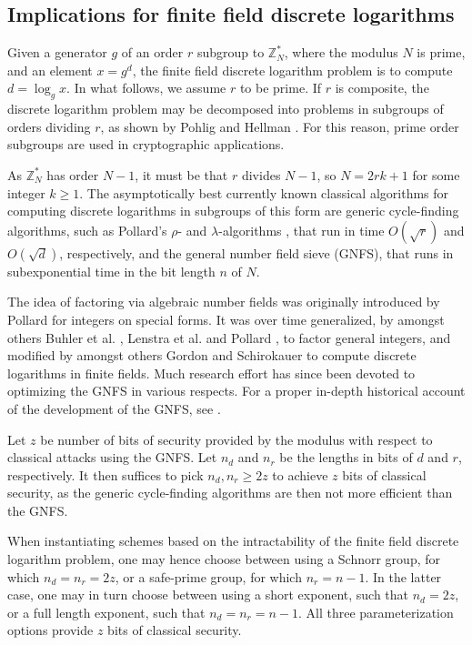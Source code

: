 \documentclass[superscriptaddress,notitlepage,longbibliography]{revtex4-1}
\theoremstyle{definition}
\theoremstyle{definition}
\newcommand{\gen}{g}
\begin{document}
\subsection{Implications for finite field discrete logarithms}
Given a generator $\gen$ of an order $r$ subgroup to $\mathbb Z^*_N$, where the modulus $N$ is prime, and an element $x = \gen^d$, the finite field discrete logarithm problem is to compute $d = \log_{\gen} x$. In what follows, we assume $r$ to be prime. If $r$ is composite, the discrete logarithm problem may be decomposed into problems in subgroups of orders dividing $r$, as shown by Pohlig and Hellman \cite{pohlig-hellman}. For this reason, prime order subgroups are used in cryptographic applications.

As $\mathbb Z_N^*$ has order $N-1$, it must be that $r$ divides $N-1$, so $N = 2rk+1$ for some integer $k \ge 1$. The asymptotically best currently known classical algorithms for computing discrete logarithms in subgroups of this form are generic cycle-finding algorithms, such as Pollard's $\rho$- and $\lambda$-algorithms \cite{pollard-rho-lambda}, that run in time $O(\sqrt{r})$ and $O(\sqrt{d})$, respectively, and the general number field sieve (GNFS), that runs in subexponential time in the bit length $n$ of $N$.

The  idea of factoring via algebraic number fields was originally introduced by Pollard \cite{pollard-cubic} for integers on special forms. It was over time generalized, by amongst others Buhler et al. \cite{buhler-nfs}, Lenstra et al. \cite{lenstra-nfs} and Pollard \cite{pollard-nfs-sieving}, to factor general integers, and modified by amongst others Gordon \cite{gordon} and Schirokauer \cite{schirokauer-thesis, schirokauer} to compute discrete logarithms in finite fields. Much research effort has since been devoted to optimizing the GNFS in various respects. For a proper in-depth historical account of the development of the GNFS, see \cite{nfs-book, pomerance1996atale}.

Let $z$ be number of bits of security provided by the modulus with respect to classical attacks using the GNFS. Let $n_d$ and $n_r$ be the lengths in bits of $d$ and $r$, respectively. It then suffices to pick $n_d, n_r \ge 2z$ to achieve $z$ bits of classical security, as the generic cycle-finding algorithms are then not more efficient than the GNFS.

When instantiating schemes based on the intractability of the finite field discrete logarithm problem, one may hence choose between using a Schnorr group, for which $n_d = n_r = 2z$, or a safe-prime group, for which $n_r = n - 1$. In the latter case, one may in turn choose between using a short exponent, such that $n_d = 2z$, or a full length exponent, such that $n_d = n_r = n - 1$. All three parameterization options provide $z$ bits of classical security.
\end{document}
